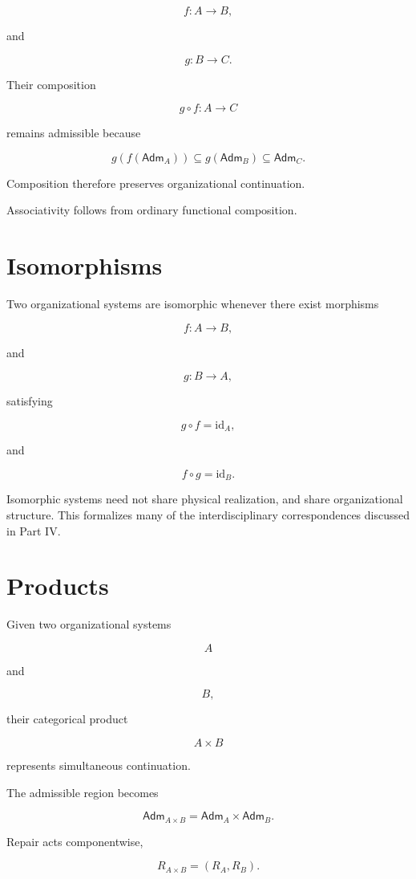 \documentclass[11pt,oneside]{book}
\numberwithin{equation}{chapter}
\theoremstyle{definition}
\theoremstyle{plain}
\newcommand{\Adm}{\mathsf{Adm}}
\begin{document}
\[
f
:
A
\rightarrow
B,
\]

and

\[
g
:
B
\rightarrow
C.
\]

Their composition

\[
g
\circ
f
:
A
\rightarrow
C
\]

remains admissible because

\[
g
(f(\Adm_A))
\subseteq
g(\Adm_B)
\subseteq
\Adm_C.
\]

Composition therefore preserves organizational continuation.

Associativity follows from ordinary functional composition.

\section{Isomorphisms}

Two organizational systems are isomorphic whenever there exist morphisms

\[
f
:
A
\rightarrow
B,
\]

and

\[
g
:
B
\rightarrow
A,
\]

satisfying

\[
g
\circ
f
=
\mathrm{id}_A,
\]

and

\[
f
\circ
g
=
\mathrm{id}_B.
\]

Isomorphic systems need not share physical realization, and share organizational structure. This formalizes many of the interdisciplinary correspondences discussed in Part IV.

\section{Products}

Given two organizational systems

\[
A
\]

and

\[
B,
\]

their categorical product

\[
A
\times
B
\]

represents simultaneous continuation.

The admissible region becomes

\[
\Adm_{A\times B}
=
\Adm_A
\times
\Adm_B.
\]

Repair acts componentwise,

\[
R_{A\times B}
=
(R_A,R_B).
\]
\end{document}

